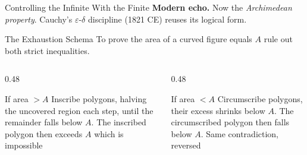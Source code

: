 \documentclass[aspectratio=169]{beamer}
\begin{document}
\begin{frame}{Controlling the Infinite With the Finite}
        \textcolor{TealThr}{\textbf{Modern echo.}} Now the
        \emph{Archimedean property}. Cauchy's
        $\varepsilon$-$\delta$ discipline (1821 CE) reuses its
        logical form.
\end{frame}


\begin{frame}{The Exhaustion Schema}
        To prove the area of a curved figure equals $A$ rule out
        both strict inequalities.

        \begin{columns}
                \begin{column}{0.48\textwidth}
                        \begin{block}{If area $> A$}
                                Inscribe polygons, halving the
                                uncovered region each step, until the
                                remainder falls below $A$.
                                The inscribed polygon then exceeds
                                $A$ which is impossible
                        \end{block}
                \end{column}
                
                \begin{column}{0.48\textwidth}
                        \begin{block}{If area $< A$}
                                Circumscribe polygons, their excess
                                shrinks below $A$. The
                                circumscribed polygon then falls below
                                $A$. Same contradiction, reversed
                        \end{block}
                \end{column}
        \end{columns}

        \begin{center}
        \end{center}


\end{frame}
\end{document}
